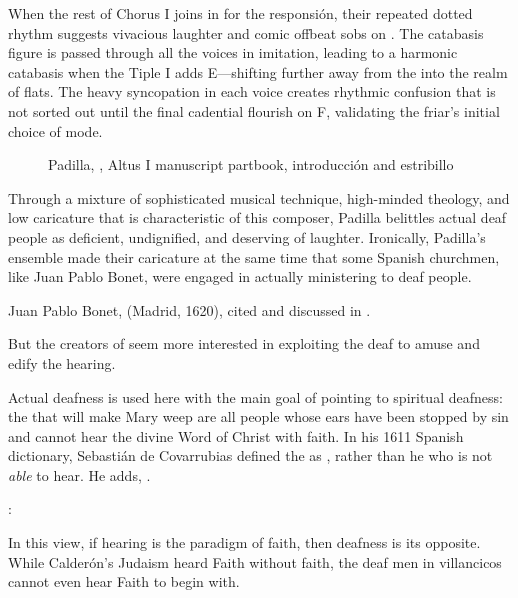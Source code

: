 When the rest of Chorus I joins in for the responsión, their repeated dotted rhythm suggests vivacious laughter and comic offbeat sobs on .
The catabasis figure is passed through all the voices in imitation, leading to a harmonic catabasis when the Tiple I adds E\fl{}---shifting further away from the  into the  realm of flats.
The heavy syncopation in each voice creates rhythmic confusion that is not sorted out until the final cadential flourish on F, validating the friar's initial choice of mode.

\begin{figure}
    \caption{Padilla, , Altus I manuscript partbook, introducción and estribillo}
    \label{figure:Padilla-Sordo-MS-estribillo}
\end{figure}

Through a mixture of sophisticated musical technique, high-minded theology, and low caricature that is characteristic of this composer, Padilla belittles actual deaf people as deficient, undignified, and deserving of laughter.
Ironically, Padilla's ensemble made their caricature at the same time that some Spanish churchmen, like Juan Pablo Bonet, were engaged in actually ministering to deaf people.%
\begin{Footnote}
    Juan Pablo Bonet,  (Madrid, 1620), cited and discussed in \autocite{Plann:DeafEducationSpain}.
\end{Footnote}
But the creators of  seem more interested in exploiting the deaf to amuse and edify the hearing.

Actual deafness is used here with the main goal of pointing to spiritual deafness: the  that will make Mary weep are all people whose ears have been stopped by sin and cannot hear the divine Word of Christ with faith.
In his 1611 Spanish dictionary, Sebastián de Covarrubias defined the  as , rather than he who is not \emph{able} to hear.
He adds, .%
\begin{Footnote}
    \Autocite[]{Covarrubias:Tesoro}:
\end{Footnote}
In this view, if hearing is the paradigm of faith, then deafness is its opposite.
While Calderón's Judaism heard Faith without faith, the deaf men in villancicos cannot even hear Faith to begin with.

